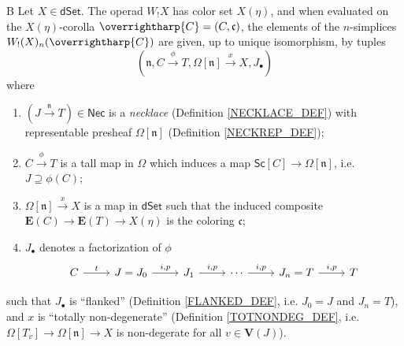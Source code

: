 \documentclass[a4paper,10pt
,draft
]{article}%
\numberwithin{equation}{section}
\numberwithin{figure}{section}
\theoremstyle{definition} %
\newcommand{\vect}[1]{\text{\overrightharp{\ensuremath{#1}}}}
\newcommand{\dSet}{\mathsf{dSet}}
\newcommand{\1}{\ensuremath{\mathbbm 1}}%
\begin{document}
\begin{customthm}{B}
        \label{THMB}
        Let $X \in \dSet$.
        The operad $W_!X$ has color set $X(\eta)$,
        and when evaluated on the $X(\eta)$-corolla
        $\vect C = (C, \mathfrak c)$,
        the elements of the $n$-simplices $W_!(X)_n(\vect C)$ are given, up to unique isomorphism, by tuples
        \[
                (\mathfrak n, C \xrightarrow{\phi} T, \Omega[\mathfrak n] \xrightarrow{x} X, J_\bullet)
        \]
        where
        \begin{enumerate}[label=(\roman*)]
        \item $(J \xrightarrow{\mathfrak{n}} T) \in \mathsf{Nec}$ is a \textit{necklace} (Definition \ref{NECKLACE_DEF})
                with representable presheaf $\Omega[\mathfrak n]$ (Definition \ref{NECKREP_DEF});
        \item $C \xrightarrow{\phi} T$
		is a tall map in $\Omega$
		which induces a map
		$\mathsf{Sc}[C] \to \Omega[\mathfrak{n}]$,
		i.e.
		$J \supseteq \phi(C)$;		
        \item $\Omega[ \mathfrak{n}] \xrightarrow{x} X$ is a map in $\mathsf{dSet}$
		such that the induced composite
		$\boldsymbol{E}(C) \to 
		\boldsymbol{E}(T) \to X(\eta)$
		is the coloring $\mathfrak{c}$;
        \item $J_{\bullet}$ denotes %
		a factorization of $\phi$	
                \begin{equation}\label{STRINCOR EQ}
                        \begin{tikzcd}
                                C \ar{r}{t}
                                &
                                J = J_0 \ar{r}{i,p}
                                &
                                J_1 \ar{r}{i,p}
                                &
                                \cdots
                                \ar{r}{i,p}
                                &
                                J_n = T \ar{r}{i,p}
                                &
                                T
                        \end{tikzcd}
                \end{equation}
	\end{enumerate}
        such that
        $J_\bullet$ is ``flanked'' (Definition \ref{FLANKED_DEF}, i.e. $J_0 = J$ and $J_n = T$), and
        $x$ is ``totally non-degenerate'' (Definition \ref{TOTNONDEG_DEF}, i.e. $\Omega[T_v] \to \Omega[\mathfrak n] \to X$ is non-degerate for all $v \in \boldsymbol{V}(J)$).
\end{customthm}
\end{document}
